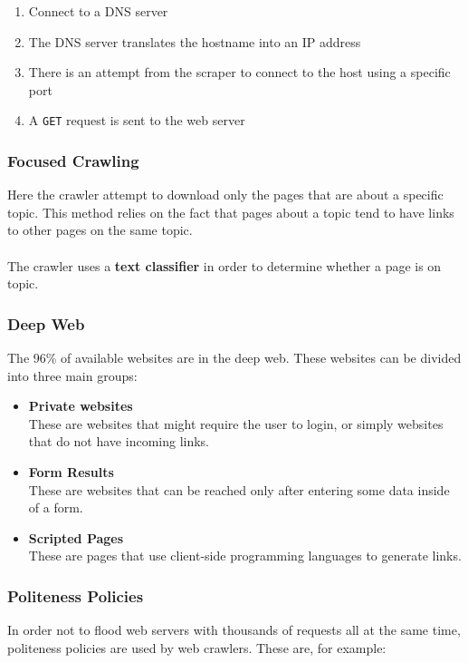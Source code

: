 \documentclass{article}
\begin{document}
\begin{enumerate}
	\item Connect to a DNS server
	\item The DNS server translates the hostname into an IP address
	\item There is an attempt from the scraper to connect to the host using a specific port
	\item A \verb|GET| request is sent to the web server
\end{enumerate}

\subsubsection{Focused Crawling}
Here the crawler attempt to download only the pages that are about a specific topic. This method relies on the fact that pages about a topic tend to have links to other pages on the same topic. \\ \\
The crawler uses a \textbf{text classifier} in order to determine whether a page is on topic.

\subsubsection{Deep Web}
The 96\% of available websites are in the deep web. These websites can be divided into three main groups:

\begin{itemize}
	\item \textbf{Private websites}
	\vspace{.2cm} \\
	These are websites that might require the user to login, or simply websites that do not have incoming links.
	
	\item \textbf{Form Results}
	\vspace{.2cm} \\
	These are websites that can be reached only after entering some data inside of a form.
	
	\item \textbf{Scripted Pages}
	\vspace{.2cm} \\
	These are pages that use client-side programming languages to generate links.
\end{itemize}

\subsubsection{Politeness Policies}
In order not to flood web servers with thousands of requests all at the same time, politeness policies are used by web crawlers. These are, for example:
\end{document}
